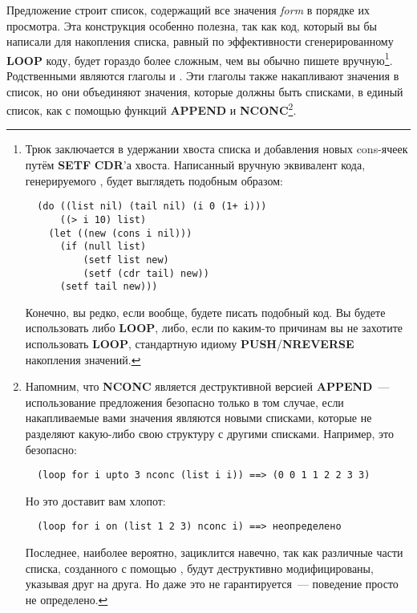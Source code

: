 Предложение  строит список, содержащий все значения \textit{form} в порядке
их просмотра. Эта конструкция особенно полезна, так как код, который вы бы написали для
накопления списка, равный по эффективности сгенерированному \textbf{LOOP} коду, будет
гораздо более сложным, чем вы обычно пишете вручную\footnote{Трюк заключается в удержании
  хвоста списка и добавления новых cons-ячеек путём \textbf{SETF} \textbf{CDR}'а
  хвоста. Написанный вручную эквивалент кода, генерируемого , будет выглядеть подобным образом:

\begin{lstlisting}
  (do ((list nil) (tail nil) (i 0 (1+ i)))
      ((> i 10) list)
    (let ((new (cons i nil)))
      (if (null list)
          (setf list new)
          (setf (cdr tail) new))
      (setf tail new)))
\end{lstlisting}

Конечно, вы редко, если вообще, будете писать подобный код. Вы будете использовать либо
\textbf{LOOP}, либо, если по каким-то причинам вы не захотите использовать \textbf{LOOP},
стандартную идиому \textbf{PUSH}/\textbf{NREVERSE} накопления значений.}. Родственными
 являются глаголы  и .  Эти глаголы также
накапливают значения в список, но они объединяют значения, которые должны быть списками, в
единый список, как с помощью функций \textbf{APPEND} и \textbf{NCONC}\footnote{Напомним,
  что \textbf{NCONC} является деструктивной версией \textbf{APPEND}~--- использование
  предложения  безопасно только в том случае, если накапливаемые вами значения
  являются новыми списками, которые не разделяют какую-либо свою структуру с другими
  списками. Например, это безопасно:

\begin{lstlisting}
  (loop for i upto 3 nconc (list i i)) ==> (0 0 1 1 2 2 3 3)
\end{lstlisting}

Но это доставит вам хлопот:

\begin{lstlisting}
  (loop for i on (list 1 2 3) nconc i) ==> неопределено
\end{lstlisting}

Последнее, наиболее вероятно, зациклится навечно, так как различные части списка, созданного
с помощью , будут деструктивно модифицированы, указывая друг на
друга. Но даже это не гарантируется~--- поведение просто не определено.}.

